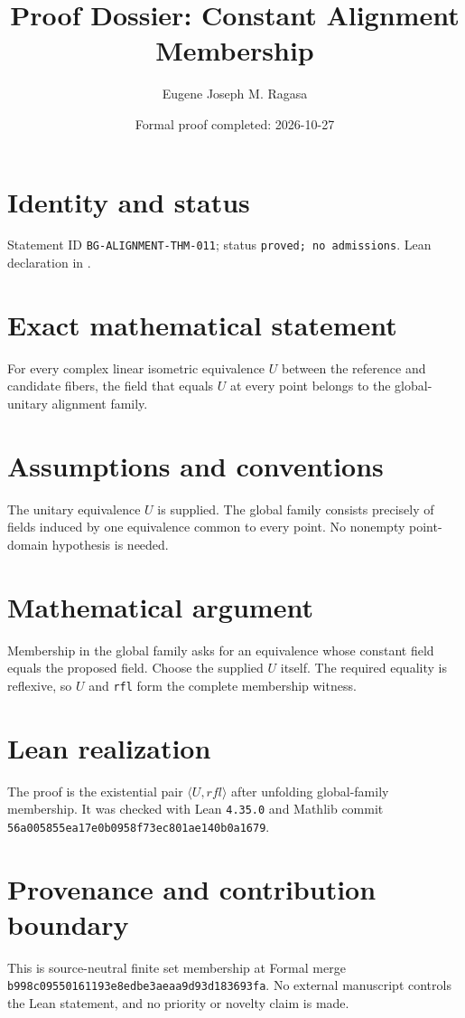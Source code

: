 \documentclass[11pt]{article}
\title{Proof Dossier: Constant Alignment Membership}
\author{Eugene Joseph M. Ragasa}
\date{Formal proof completed: 2026-10-27}
\begin{document}
\raggedright
\maketitle

\section{Identity and status}
Statement ID \texttt{BG-ALIGNMENT-THM-011}; status \texttt{proved; no admissions}. Lean declaration
 in
.

\section{Exact mathematical statement}
For every complex linear isometric equivalence $U$ between the reference and candidate fibers,
the field that equals $U$ at every point belongs to the global-unitary alignment family.

\section{Assumptions and conventions}
The unitary equivalence $U$ is supplied. The global family consists precisely of fields induced
by one equivalence common to every point. No nonempty point-domain hypothesis is needed.

\section{Mathematical argument}
Membership in the global family asks for an equivalence whose constant field equals the proposed
field. Choose the supplied $U$ itself. The required equality is reflexive, so $U$ and
\texttt{rfl} form the complete membership witness.

\section{Lean realization}
The proof is the existential pair \texttt{\(\langle U, rfl\rangle\)} after unfolding global-family
membership. It was checked with Lean \texttt{4.35.0} and Mathlib commit
\texttt{56a005855ea17e0b0958f73ec801ae140b0a1679}.

\section{Provenance and contribution boundary}
This is source-neutral finite set membership at Formal merge
\texttt{b998c09550161193e8edbe3aeaa9d93d183693fa}. No external manuscript controls the Lean
statement, and no priority or novelty claim is made.
\end{document}
